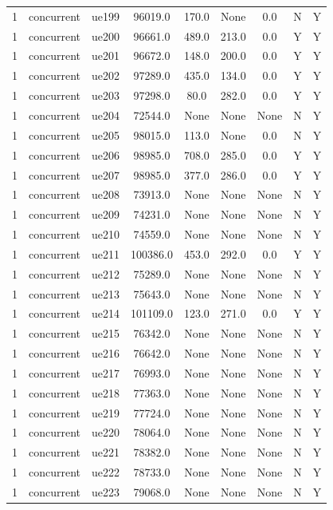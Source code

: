 \begin{table}[ht]
\begin{tabular}{|c|c|c|c|c|c|c|c|c|}
1 & concurrent & ue199 & 96019.0 & 170.0 & None & 0.0 & N & Y \\
1 & concurrent & ue200 & 96661.0 & 489.0 & 213.0 & 0.0 & Y & Y \\
1 & concurrent & ue201 & 96672.0 & 148.0 & 200.0 & 0.0 & Y & Y \\
1 & concurrent & ue202 & 97289.0 & 435.0 & 134.0 & 0.0 & Y & Y \\
1 & concurrent & ue203 & 97298.0 & 80.0 & 282.0 & 0.0 & Y & Y \\
1 & concurrent & ue204 & 72544.0 & None & None & None & N & Y \\
1 & concurrent & ue205 & 98015.0 & 113.0 & None & 0.0 & N & Y \\
1 & concurrent & ue206 & 98985.0 & 708.0 & 285.0 & 0.0 & Y & Y \\
1 & concurrent & ue207 & 98985.0 & 377.0 & 286.0 & 0.0 & Y & Y \\
1 & concurrent & ue208 & 73913.0 & None & None & None & N & Y \\
1 & concurrent & ue209 & 74231.0 & None & None & None & N & Y \\
1 & concurrent & ue210 & 74559.0 & None & None & None & N & Y \\
1 & concurrent & ue211 & 100386.0 & 453.0 & 292.0 & 0.0 & Y & Y \\
1 & concurrent & ue212 & 75289.0 & None & None & None & N & Y \\
1 & concurrent & ue213 & 75643.0 & None & None & None & N & Y \\
1 & concurrent & ue214 & 101109.0 & 123.0 & 271.0 & 0.0 & Y & Y \\
1 & concurrent & ue215 & 76342.0 & None & None & None & N & Y \\
1 & concurrent & ue216 & 76642.0 & None & None & None & N & Y \\
1 & concurrent & ue217 & 76993.0 & None & None & None & N & Y \\
1 & concurrent & ue218 & 77363.0 & None & None & None & N & Y \\
1 & concurrent & ue219 & 77724.0 & None & None & None & N & Y \\
1 & concurrent & ue220 & 78064.0 & None & None & None & N & Y \\
1 & concurrent & ue221 & 78382.0 & None & None & None & N & Y \\
1 & concurrent & ue222 & 78733.0 & None & None & None & N & Y \\
1 & concurrent & ue223 & 79068.0 & None & None & None & N & Y \\

\end{tabular}
\end{table}
